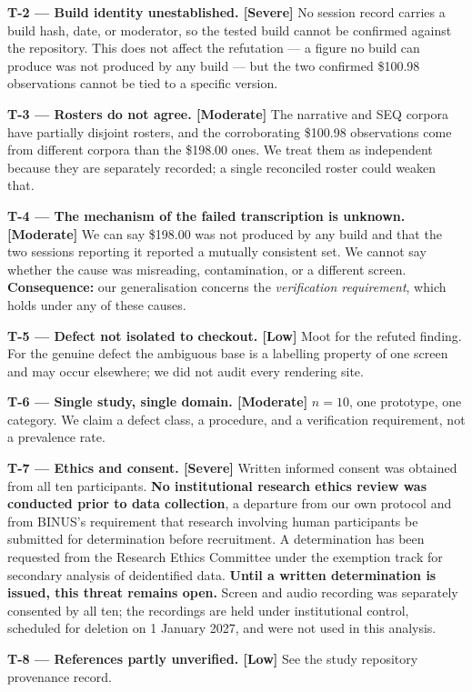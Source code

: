 \documentclass[conference]{IEEEtran}
\begin{document}
\textbf{T-2 --- Build identity unestablished. [Severe]} No session record carries a build hash, date, or
moderator, so the tested build cannot be confirmed against the repository. This does not affect the
refutation --- a figure no build can produce was not produced by any build --- but the two confirmed
\$100.98 observations cannot be tied to a specific version.

\textbf{T-3 --- Rosters do not agree. [Moderate]} The narrative and SEQ corpora have partially disjoint
rosters, and the corroborating \$100.98 observations come from different corpora than the \$198.00 ones.
We treat them as independent because they are separately recorded; a single reconciled roster could
weaken that.

\textbf{T-4 --- The mechanism of the failed transcription is unknown. [Moderate]} We can say \$198.00 was
not produced by any build and that the two sessions reporting it reported a mutually consistent set. We
cannot say whether the cause was misreading, contamination, or a different screen.
\textbf{Consequence:} our generalisation concerns the \emph{verification requirement}, which holds under
any of these causes.

\textbf{T-5 --- Defect not isolated to checkout. [Low]} Moot for the refuted finding. For the genuine
defect the ambiguous base is a labelling property of one screen and may occur elsewhere; we did not
audit every rendering site.

\textbf{T-6 --- Single study, single domain. [Moderate]} $n = 10$, one prototype, one category. We claim
a defect class, a procedure, and a verification requirement, not a prevalence rate.

\textbf{T-7 --- Ethics and consent. [Severe]} Written informed consent was obtained from all ten
participants. \textbf{No institutional research ethics review was conducted prior to data collection},
a departure from our own protocol and from BINUS's requirement that research involving human
participants be submitted for determination before recruitment. A determination has been requested from
the Research Ethics Committee under the exemption track for secondary analysis of deidentified data.
\textbf{Until a written determination is issued, this threat remains open.} Screen and audio recording
was separately consented by all ten; the recordings are held under institutional control, scheduled for
deletion on 1 January 2027, and were not used in this analysis.

\textbf{T-8 --- References partly unverified. [Low]} See the study repository provenance record.
\end{document}
